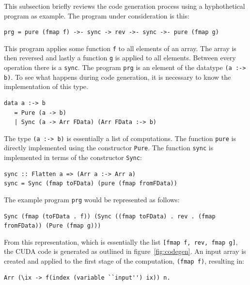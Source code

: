 This subsection briefly reviews the code generation process using 
a hyphothetical program as example. The program under consideration 
is this: 

\begin{small}
\begin{verbatim}
prg = pure (fmap f) ->- sync -> rev ->- sync ->- pure (fmap g) 
\end{verbatim}
\end{small}

This program applies some function {\tt f} to all elements of 
an array. The array is then reversed and lastly a function {\tt g} 
is applied to all elements. Between every operation there is a {\tt sync}.
The program {\tt prg} is an element of the datatype {\tt (a :-> b)}. 
To see what happens during code generation, it is necessary to know 
the implementation of this type.
\begin{small}
\begin{verbatim} 
data a :-> b 
   = Pure (a -> b) 
   | Sync (a -> Arr FData) (Arr FData :-> b) 
\end{verbatim}
\end{small} 
\noindent
The type {\tt (a :-> b)} is essentially a list of computations. The 
function {\tt pure} is directly implemented using the constructor 
{\tt Pure}. The function {\tt sync} is implemented in terms of the 
constructor {\tt Sync}:

\begin{small}
\begin{verbatim} 
sync :: Flatten a => (Arr a :-> Arr a)
sync = Sync (fmap toFData) (pure (fmap fromFData))
\end{verbatim}
\end{small} 
\noindent
The example program {\tt prg} would be represented as follows: 
%
\begin{small}
\begin{verbatim} 
Sync (fmap (toFData . f)) (Sync ((fmap toFData) . rev . (fmap fromFData)) (Pure (fmap g)))   
\end{verbatim}
\end{small} 
\noindent
From this representation, which is essentially the list {\tt [fmap f, rev, fmap g]},
the CUDA code is generated as outlined in figure~\ref{fig:codegen}. 
An input array is created and applied to the first stage of the computation, 
{\tt (fmap f)}, resulting in: 
\begin{small}
\begin{verbatim}
Arr (\ix -> f(index (variable ``input'') ix)) n. 
\end{verbatim}
\end{small}


